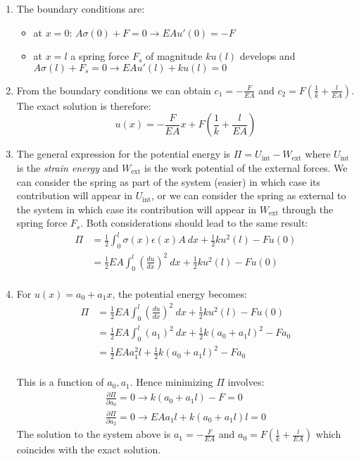 \documentclass{article}
\newcommand{\ee}{\end{equation}}
\newcommand{\be}{\begin{equation}}
\newcommand{\bi}{\begin{itemize}}
\newcommand{\ei}{\end{itemize}}
\newcommand{\pa}{\partial}
\begin{document}
\begin{enumerate}
\item The boundary conditions are:
\bi
\item at $x=0$: $A\sigma(0)+F=0 \to EAu'(0)=-F$ 
\item at $x=l$ a spring force $F_s$ of magnitude $ku(l)$ develops and $A \sigma(l)+F_s=0 \to EA u'(l)+ku(l)=0 $
\ei

\item From the boundary conditions we can obtain $c_1=-\frac{F}{EA}$ and $c_2=F(\frac{1}{k}+\frac{l}{EA})$. The exact solution is therefore:
\be
u(x)=-\frac{F}{EA}x+F(\frac{1}{k}+\frac{l}{EA})
\ee


\item The general expression for the potential energy is $\Pi=U_{\textrm{int}}-W_{\textrm{ext}}$ where $U_{\textrm{int}}$ is the {\em  strain energy}  and
$W_{\textrm{ext}}$ is the work potential of the external forces. We can consider the spring as part of the system (easier) in which case its contribution will
appear in $U_{\textrm{int}}$, or we can consider the spring as external to the system in which case its contribution will appear in $W_{\textrm{ext}}$ through
the spring force $F_s$. Both considerations should lead to the same result:
\be
\begin{array}{ll}
 \Pi&=\frac{1}{2} \int_0^l \sigma(x) \epsilon(x) A~dx+\frac{1}{2} ku^2(l)-F u(0) \\
 &=\frac{1}{2} EA \int_0^l (\frac{du}{dx})^2 ~dx+\frac{1}{2} ku^2(l)-F u(0)\\
\end{array}
\ee


\item For $u(x)=a_0+a_1x$, the potential energy becomes:
\be
\begin{array}{ll}
 \Pi &=\frac{1}{2} EA \int_0^l (\frac{du}{dx})^2 ~dx+\frac{1}{2} ku^2(l)-F u(0)\\
 &= \frac{1}{2} EA \int_0^l (a_1)^2 ~dx+\frac{1}{2} k(a_0+a_1l)^2-F a_0\\
 &= \frac{1}{2} EA  a_1^2 l+\frac{1}{2} k(a_0+a_1l)^2-F a_0\\
\end{array}
\ee

This is a function of $a_0,a_1$. Hence minimizing $\Pi$ involves:
\be
\begin{array}{l}
 \frac{\pa \Pi}{\pa a_0}=0 \to  k(a_0+a_1l)-F=0 \\
  \frac{\pa \Pi}{\pa a_2}=0 \to  EA a_1 l + k(a_0+a_1l)l=0
\end{array}
\ee
The solution to the system above is $a_1=-\frac{F}{EA}$ and $a_0=F(\frac{1}{k}+\frac{l}{EA})$ which coincides with the exact solution.


\end{enumerate}
\end{document}
